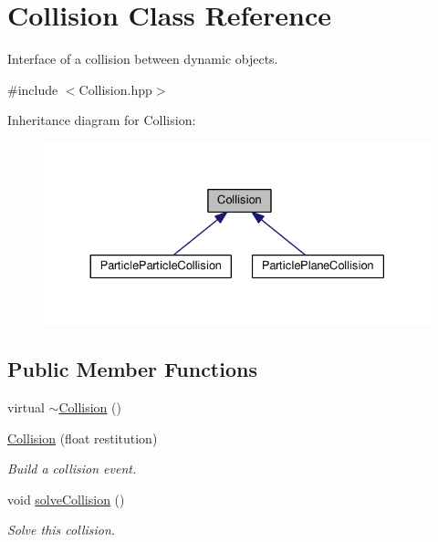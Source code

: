 \hypertarget{classCollision}{\section{Collision Class Reference}
\label{classCollision}
}


Interface of a collision between dynamic objects.  




{\ttfamily \#include $<$Collision.\+hpp$>$}



Inheritance diagram for Collision\+:\nopagebreak
\begin{figure}[H]
\begin{center}
\leavevmode
\includegraphics[width=330pt]{classCollision__inherit__graph}
\end{center}
\end{figure}
\subsection*{Public Member Functions}
\begin{DoxyCompactItemize}
\item 
virtual \hyperlink{classCollision_a81d1b669d7a8b03b178e794168ba7cec}{$\sim$\+Collision} ()
\item 
\hyperlink{classCollision_a62947cd726f639f2a30ad5deaa49ab71}{Collision} (float restitution)
\begin{DoxyCompactList}\small\item\em Build a collision event. \end{DoxyCompactList}\item 
void \hyperlink{classCollision_ad98c7014fd4237d0f0dcd159fdd24d1f}{solve\+Collision} ()
\begin{DoxyCompactList}\small\item\em Solve this collision. \end{DoxyCompactList}\end{DoxyCompactItemize}

